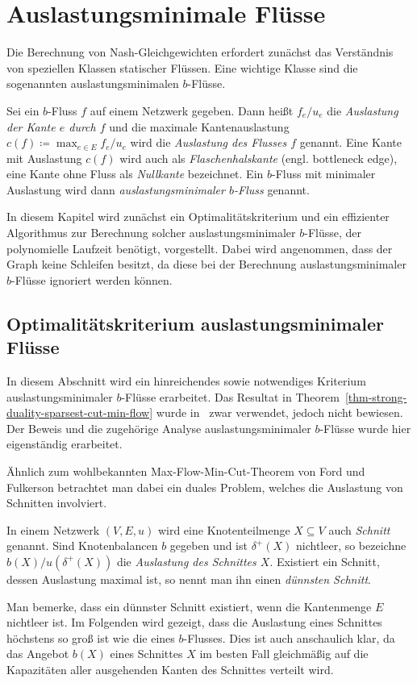 \chapter{Auslastungsminimale Flüsse}\label{chapter-min-con-flows}

Die Berechnung von Nash-Gleichgewichten erfordert zunächst das Verständnis von speziellen Klassen statischer Flüssen.
Eine wichtige Klasse sind die sogenannten auslastungsminimalen $b$-Flüsse.

\begin{definition}
	Sei ein $b$-Fluss $f$ auf einem Netzwerk gegeben.
	Dann heißt $f_e/u_e$ die \emph{Auslastung der Kante $e$ durch $f$} und die maximale Kantenauslastung $c(f)\coloneq \max_{e\in E} f_e/u_e$ wird die \emph{Auslastung des Flusses $f$} genannt.
	Eine Kante mit Auslastung $c(f)$ wird auch als \emph{Flaschenhalskante} (engl. bottleneck edge), eine Kante ohne Fluss als \emph{Nullkante} bezeichnet.
	Ein $b$-Fluss mit minimaler Auslastung wird dann \emph{auslastungsminimaler $b$-Fluss} genannt.
\end{definition}

In diesem Kapitel wird zunächst ein Optimalitätskriterium und ein effizienter Algorithmus zur Berechnung solcher auslastungsminimaler $b$-Flüsse, der polynomielle Laufzeit benötigt, vorgestellt.
Dabei wird angenommen, dass der Graph keine Schleifen besitzt, da diese bei der Berechnung auslastungsminimaler $b$-Flüsse ignoriert werden können.

\section{Optimalitätskriterium auslastungsminimaler Flüsse}

In diesem Abschnitt wird ein hinreichendes sowie notwendiges Kriterium auslastungsminimaler $b$-Flüsse erarbeitet.
Das Resultat in Theorem~\ref{thm-strong-duality-sparsest-cut-min-flow} wurde in~\cite[Theorem 6.11]{Koch2012} zwar verwendet, jedoch nicht bewiesen.
Der Beweis und die zugehörige Analyse auslastungsminimaler $b$-Flüsse wurde hier eigenständig erarbeitet.

Ähnlich zum wohlbekannten Max-Flow-Min-Cut-Theorem von Ford und Fulkerson betrachtet man dabei ein duales Problem, welches die Auslastung von Schnitten involviert.

\begin{definition}[Schnitt]
	In einem Netzwerk $(V, E, u)$ wird eine Knotenteilmenge $X\subseteq V$ auch \emph{Schnitt} genannt.
	Sind Knotenbalancen $b$ gegeben und ist $\delta^+(X)$ nichtleer, so bezeichne $b(X) / u(\delta^+(X))$ die \emph{Auslastung des Schnittes $X$}.
	Existiert ein Schnitt, dessen Auslastung maximal ist, so nennt man ihn einen \emph{dünnsten Schnitt}.
\end{definition}
Man bemerke, dass ein dünnster Schnitt existiert, wenn die Kantenmenge $E$ nichtleer ist.
Im Folgenden wird gezeigt, dass die Auslastung eines Schnittes höchstens so groß ist wie die eines $b$-Flusses.
Dies ist auch anschaulich klar, da das Angebot $b(X)$ eines Schnittes $X$ im besten Fall gleichmäßig auf die Kapazitäten aller ausgehenden Kanten des Schnittes verteilt wird.

